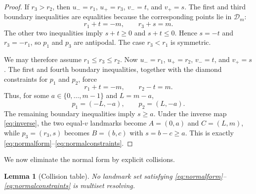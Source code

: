 \documentclass[11pt]{amsart}
\newtheorem{lemma}[lemma]{Lemma}
\theoremstyle{remark}
\newcommand{\D}{\mathcal D}
\begin{document}
\begin{proof}
If $r_3>r_2$, then $u_-=r_1$, $u_+=r_3$, $v_-=t$, and $v_+=s$.  The first and third boundary inequalities are equalities because the corresponding points lie in $\D_m$:
\[
 r_1+t=-m,
 \qquad
 r_3+s=m.
\]
The other two inequalities imply $s+t\ge0$ and $s+t\le0$.  Hence $s=-t$ and $r_3=-r_1$, so $p_1$ and $p_3$ are antipodal.  The case $r_3<r_1$ is symmetric.

We may therefore assume $r_1\le r_3\le r_2$.  Now $u_-=r_1$, $u_+=r_2$, $v_-=t$, and $v_+=s$.  The first and fourth boundary inequalities, together with the diamond constraints for $p_1$ and $p_2$, force
\[
 r_1+t=-m,
 \qquad
 r_2-t=m.
\]
Thus, for some $a\in\{0,\dots,m-1\}$ and $L=m-a$,
\[
 p_1=(-L,-a),
 \qquad
 p_2=(L,-a).
\]
The remaining boundary inequalities imply $s\ge a$.  Under the inverse map \eqref{eq:inverse}, the two equal-$v$ landmarks become $A=(0,a)$ and $C=(L,m)$, while $p_3=(r_3,s)$ becomes $B=(b,c)$ with $s=b-c\ge a$.  This is exactly \eqref{eq:normalform}--\eqref{eq:normalconstraints}.
\end{proof}

We now eliminate the normal form by explicit collisions.

\begin{lemma}[Collision table]\label{lem:collisiontable}
No landmark set satisfying \eqref{eq:normalform}--\eqref{eq:normalconstraints} is multiset resolving.
\end{lemma}
\end{document}
